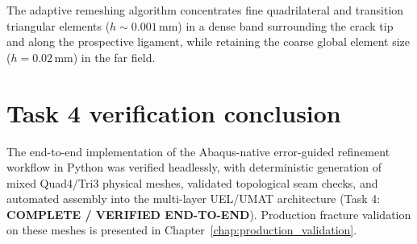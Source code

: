 The adaptive remeshing algorithm concentrates fine quadrilateral and transition triangular elements ($h \sim 0.001\,\mathrm{mm}$) in a dense band surrounding the crack tip and along the prospective ligament, while retaining the coarse global element size ($h = 0.02\,\mathrm{mm}$) in the far field.

\section{Task 4 verification conclusion}
The end-to-end implementation of the Abaqus-native error-guided refinement workflow in Python was verified headlessly, with deterministic generation of mixed Quad4/Tri3 physical meshes, validated topological seam checks, and automated assembly into the multi-layer UEL/UMAT architecture (Task 4: \textbf{COMPLETE / VERIFIED END-TO-END}). Production fracture validation on these meshes is presented in Chapter~\ref{chap:production_validation}.
